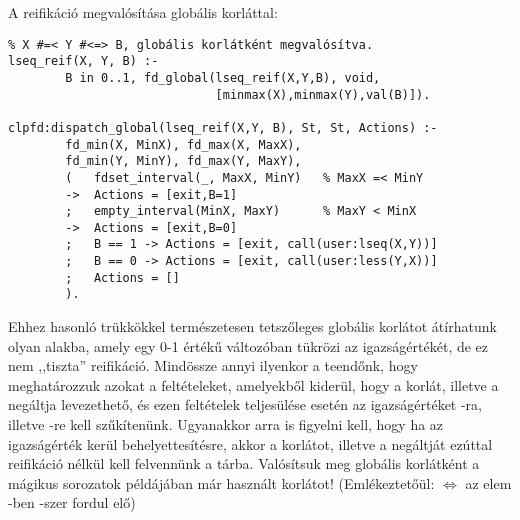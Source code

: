 A reifikáció megvalósítása globális korláttal:

\begin{verbatim}
% X #=< Y #<=> B, globális korlátként megvalósítva.
lseq_reif(X, Y, B) :-
        B in 0..1, fd_global(lseq_reif(X,Y,B), void,
                             [minmax(X),minmax(Y),val(B)]).

clpfd:dispatch_global(lseq_reif(X,Y, B), St, St, Actions) :-
        fd_min(X, MinX), fd_max(X, MaxX),
        fd_min(Y, MinY), fd_max(Y, MaxY),
        (   fdset_interval(_, MaxX, MinY)   % MaxX =< MinY
        ->  Actions = [exit,B=1]
        ;   empty_interval(MinX, MaxY)      % MaxY < MinX
        ->  Actions = [exit,B=0]
        ;   B == 1 -> Actions = [exit, call(user:lseq(X,Y))]
        ;   B == 0 -> Actions = [exit, call(user:less(Y,X))]
        ;   Actions = []
        ).
\end{verbatim}

Ehhez hasonló trükkökkel természetesen tetszőleges globális korlátot átírhatunk
olyan alakba, amely egy 0-1 értékű változóban tükrözi az igazságértékét, de
ez nem ,,tiszta'' reifikáció. Mindössze annyi ilyenkor a teendőnk, hogy meghatározzuk
azokat a feltételeket, amelyekből kiderül, hogy a korlát, illetve a negáltja levezethető,
és ezen feltételek teljesülése esetén az igazságértéket -ra, illetve -re
kell szűkítenünk. Ugyanakkor arra is figyelni kell, hogy ha az igazságérték kerül
behelyettesítésre, akkor a korlátot, illetve a negáltját ezúttal reifikáció nélkül
kell felvennünk a tárba.
\br
Valósítsuk meg globális korlátként a mágikus sorozatok példájában már használt
 korlátot! (Emlékeztetőül:  $\Leftrightarrow$
az  elem -ben -szer fordul elő)

